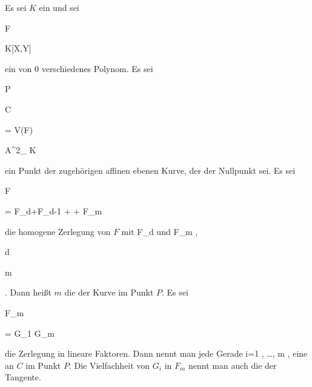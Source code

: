 {


Es sei $K$ ein
und sei


\mavergleichskette

{\vergleichskette

{ F
}

{ \in }{ K[X,Y]
}

{  }{
}

{    }{
}

{   }{
}

}
{}{}{}
ein von $0$ verschiedenes Polynom. Es sei


\mavergleichskette

{\vergleichskette

{ P
}

{ \in }{ C
}

{ = }{ V(F)
}

{ \subset   }{ {\mathbb A}^{2}_{ K }
}

{   }{
}

}
{}{}{}
ein Punkt der zugehörigen affinen ebenen Kurve, der
 {} {}
der Nullpunkt sei. Es sei


\mavergleichskettedisp

{\vergleichskette

{ F
}

{ =} { F_d+F_{d-1} + \cdots +  F_m
}

{ } {
}

{ } {
}

{ } {
}

}
{}{}{}
die homogene Zerlegung von $F$ mit \mathkor {} {F_d } {und} {F_m } {,}


\mavergleichskette

{\vergleichskette

{ d
}

{ \geq }{ m
}

{  }{
}

{    }{
}

{   }{
}

}
{}{}{.}
Dann heißt $m$ die  der Kurve im Punkt $P$. Es sei


\mavergleichskette

{\vergleichskette

{ F_m
}

{ = }{ G_1 \cdots G_m
}

{  }{
}

{    }{
}

{   }{
}

}
{}{}{}
die Zerlegung in lineare Faktoren. Dann nennt man jede Gerade  { i=1 , \ldots , m   }{,} eine  an $C$ im Punkt $P$. Die Vielfachheit von $G_i$ in $F_m$ nennt man auch die  der Tangente.


}


